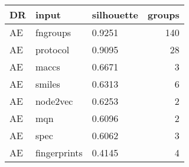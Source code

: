 \begin{tabular}{lllr}
\toprule
    DR &         input & silhouette &  groups \\
\midrule
AE &      fngroups &     0.9251 &     140 \\
AE &      protocol &     0.9095 &      28 \\
AE &         maccs &     0.6671 &       3 \\
AE &        smiles &     0.6313 &       6 \\
AE &      node2vec &     0.6253 &       2 \\
AE &           mqn &     0.6096 &       2 \\
AE &          spec &     0.6062 &       3 \\
AE &  fingerprints &     0.4145 &       4 \\
\bottomrule
\end{tabular}